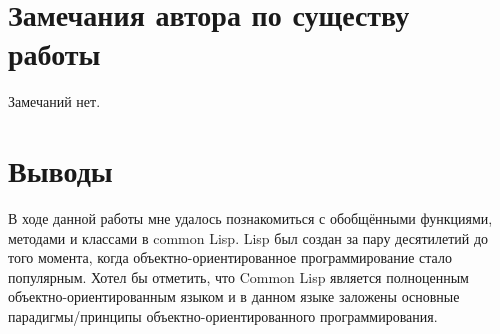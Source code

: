 \documentclass[12pt]{article}
\begin{document}
\section{Замечания автора по существу работы}
Замечаний нет.

\section{Выводы}
В ходе данной работы мне удалось познакомиться с обобщёнными функциями, методами и классами в common Lisp. Lisp был создан за пару десятилетий до того момента, когда объектно-ориентированное программирование стало популярным. Хотел бы отметить, что  Common Lisp является полноценным объектно-ориентированным языком и в данном языке заложены основные парадигмы/принципы объектно-ориентированного программирования.
\end{document}
